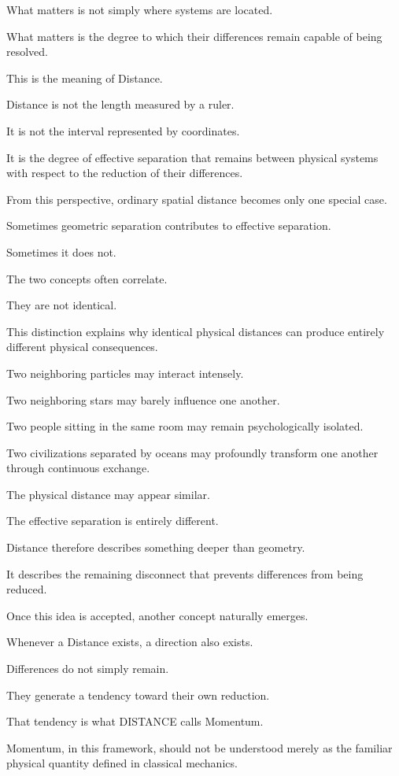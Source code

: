 What matters is not simply where systems are located.

What matters is the degree to which their differences remain capable of being resolved.

This is the meaning of Distance.

Distance is not the length measured by a ruler.

It is not the interval represented by coordinates.

It is the degree of effective separation that remains between physical systems with respect to the reduction of their differences.

From this perspective, ordinary spatial distance becomes only one special case.

Sometimes geometric separation contributes to effective separation.

Sometimes it does not.

The two concepts often correlate.

They are not identical.

This distinction explains why identical physical distances can produce entirely different physical consequences.

Two neighboring particles may interact intensely.

Two neighboring stars may barely influence one another.

Two people sitting in the same room may remain psychologically isolated.

Two civilizations separated by oceans may profoundly transform one another through continuous exchange.

The physical distance may appear similar.

The effective separation is entirely different.

Distance therefore describes something deeper than geometry.

It describes the remaining disconnect that prevents differences from being reduced.

Once this idea is accepted, another concept naturally emerges.

Whenever a Distance exists, a direction also exists.

Differences do not simply remain.

They generate a tendency toward their own reduction.

That tendency is what DISTANCE calls Momentum.

Momentum, in this framework, should not be understood merely as the familiar physical quantity defined in classical mechanics.

